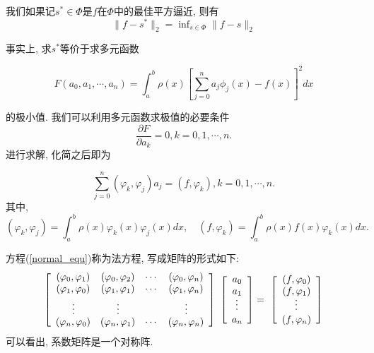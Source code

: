 \documentclass[a4paper]{article}
\begin{document}
\begin{spacing}{1.5}
\begin{CJK*}{GBK}{song}
我们如果记$s^*\in\Phi$是$f$在$\Phi$中的最佳平方逼近, 则有
\begin{equation}
\parallel f-s^*\parallel _2 =  \mathop{\text{inf}}_{s\in\Phi}\parallel f-s\parallel _2
\end{equation}

事实上, 求$s^*$等价于求多元函数

$$F(a_0, a_1, \cdots, a_n)=\int_a^b\rho(x)[\sum_{j=0}^na_j\phi_j(x)-f(x)]^2dx$$

的极小值. 我们可以利用多元函数求极值的必要条件
$$\frac{\partial F}{\partial a_k}=0, k=0, 1, \cdots, n.$$
进行求解, 化简之后即为

\begin{equation}\label{normal_equ}
\sum_{j=0}^{n}(\varphi_k,\varphi_j)a_j=(f,\varphi_k), k=0, 1, \cdots, n.
\end{equation}
其中,
$$(\varphi_k,\varphi_j)=\int_a^b\rho(x)\varphi_k(x)\varphi_j(x)dx,\quad (f,\varphi_k)=\int_a^b\rho(x)f(x)\varphi_k(x)dx.$$

方程(\ref{normal_equ})称为法方程, 写成矩阵的形式如下:
\begin{equation}\label{normal_equ_mat}
\left[                %
            \begin{array}{cccc}   %
            (\varphi_0,\varphi_1)&(\varphi_0,\varphi_2) & \cdots&(\varphi_0,\varphi_n)  \\  %
            (\varphi_1,\varphi_0)&(\varphi_1,\varphi_1) & \cdots&(\varphi_1,\varphi_n)  \\
             \rotatebox{-90}{$\cdots$} & \rotatebox{-90}{$\cdots$}& &\rotatebox{-90}{$\cdots$} \\
            (\varphi_n,\varphi_0)&(\varphi_n,\varphi_1) & \cdots&(\varphi_n,\varphi_n)  \\
            \end{array}
            \right]             %
\
\left[
            \begin{array}{c}
            a_0 \\
            a_1 \\
            \rotatebox{90}{$\cdots$} \\
            a_{n}\\
            \end{array}
            \right]
=
\
\left[
            \begin{array}{c}
            (f,\varphi_0) \\
            (f,\varphi_1) \\
            \rotatebox{90}{$\cdots$} \\
           (f,\varphi_{n})\\
            \end{array}
            \right]
\end{equation}
可以看出, 系数矩阵是一个对称阵.


\end{CJK*}
\end{spacing}
\end{document}
